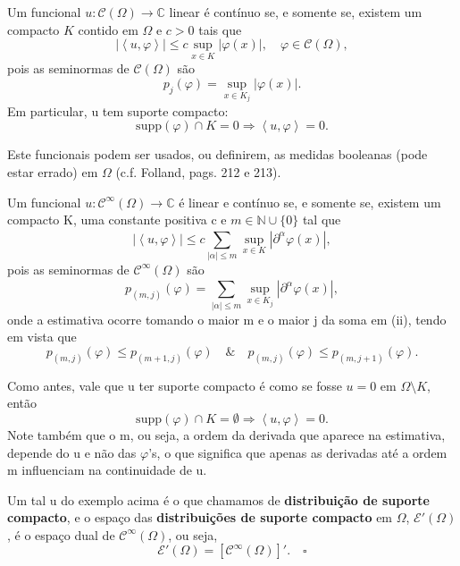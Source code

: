 \documentclass[../distribution_theory_notes.tex]{subfiles}
\begin{document}
\begin{example}
	Um funcional \(u:\mathcal{C}(\Omega )\rightarrow \mathbb{C}\) linear é contínuo se, e somente se, existem um compacto \(K\) contido em \(\Omega \) e \(c > 0\) tais que
	\[
		|\left< u, \varphi  \right>|\leq c \sup_{x\in K}|\varphi(x)|, \quad \varphi \in \mathcal{C}(\Omega ),
	\]
	pois as seminormas de \(\mathcal{C}(\Omega )\) são
	\[
		p_{j}(\varphi )=\sup_{x\in K_{j}}|\varphi(x)|.
	\]
	Em particular, u tem suporte compacto:
	\[
		\mathrm{supp}(\varphi )\cap K= 0 \Rightarrow \left< u, \varphi  \right>=0.
	\]

	Este funcionais podem ser usados, ou definirem, as medidas booleanas (pode estar errado) em \(\Omega \) (c.f. Folland, pags. 212 e 213).
\end{example}
\begin{example}
	Um funcional \(u:\mathcal{C}^{\infty}(\Omega )\rightarrow \mathbb{C}\) é linear e contínuo se, e somente se, existem um compacto K, uma constante positiva c e \(m\in \mathbb{N}\cup \{0\}\) tal que
	\[
		|\left< u, \varphi  \right>| \leq c \sum\limits_{|\alpha |\leq m}^{}\sup_{x\in K}|\partial^{\alpha }\varphi (x)|,
	\]
	pois as seminormas de \(\mathcal{C}^{\infty}(\Omega )\) são
	\[
		p_{(m, j)}(\varphi ) = \sum\limits_{|\alpha |\leq m}^{} \sup_{x\in K_{j}}|\partial ^{\alpha }\varphi(x)|,
	\]
	onde a estimativa ocorre tomando o maior m e o maior j da soma em (ii), tendo em vista que
	\[
		p_{(m, j)}(\varphi )\leq p_{(m+1, j)}(\varphi )\quad\&\quad p_{(m, j)}(\varphi )\leq p_{(m, j+1)}(\varphi ).
	\]

	Como antes, vale que u ter suporte compacto é como se fosse \(u=0\) em \(\Omega \setminus{K}\), então
	\[
		\mathrm{supp}(\varphi )\cap K=\emptyset \Rightarrow \left< u, \varphi  \right>=0.
	\]
	Note também que o m, ou seja, a ordem da derivada que aparece na estimativa, depende do u e não das \(\varphi \)'s, o que significa que apenas as derivadas até a ordem m influenciam na continuidade de u.
\end{example}
\begin{def*}
	Um tal u do exemplo acima é o que chamamos de \textbf{distribuição de suporte compacto}, e o espaço das \textbf{distribuições de suporte compacto} em \(\Omega \), \(\mathcal{E}'(\Omega )\), é o espaço dual de \(\mathcal{C}^{\infty}(\Omega )\), ou seja,
	\[
		\mathcal{E}'(\Omega )=[\mathcal{C}^{\infty}(\Omega )]'. \quad \square
	\]
\end{def*}
\end{document}
